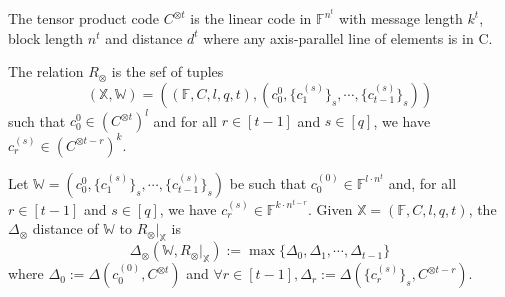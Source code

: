 \begin{definition}
The tensor product code $C^{\otimes t}$ is the linear code in $\mathbb{F}^{n^t}$ with message length $k^t$, block length $n^t$ and distance $d^t$ where any axis-parallel line of elements is in C.
\end{definition}

\begin{definition}
The relation $R_\otimes$ is the sef of tuples
$$
    (\mathbb{X}, \mathbb{W}) = ((\mathbb{F}, C, l, q, t), (c_0^{0}, \{c_1^{(s)}\}_s, \cdots, \{c_{t-1}^{(s)}\}_s))
$$ 
such that $c_0^{0} \in (C^{\otimes t})^l$ and for all $r \in [t-1]$ and $s \in [q]$, we have $c_r^{(s)} \in (C^{\otimes t-r})^k$.
\end{definition}

\begin{definition}
Let $\mathbb{W} = (c_0^{0}, \{c_1^{(s)}\}_s, \cdots, \{c_{t-1}^{(s)}\}_s)$ be such that $c_0^{(0)} \in \mathbb{F}^{l \cdot n^t}$ and, for all $r \in [t-1]$ and $s \in [q]$, we have $c_r^{(s)} \in \mathbb{F}^{k \cdot n^{t-r}}$. Given $\mathbb{X} = (\mathbb{F}, C, l, q, t)$, the $\Delta_\otimes$ distance of $\mathbb{W}$ to $R_\otimes|_{\mathbb{X}}$ is
$$
    \Delta_\otimes(\mathbb{W}, R_\otimes|_{\mathbb{X}}) := \max \{\Delta_0, \Delta_1, \cdots, \Delta_{t-1}\}
$$
where $\Delta_0 := \Delta(c_0^{(0)}, C^{\otimes t})$ and $\forall r \in [t-1], \Delta_r := \Delta(\{c_r^{(s)}\}_s, C^{\otimes t-r})$.
\end{definition}
